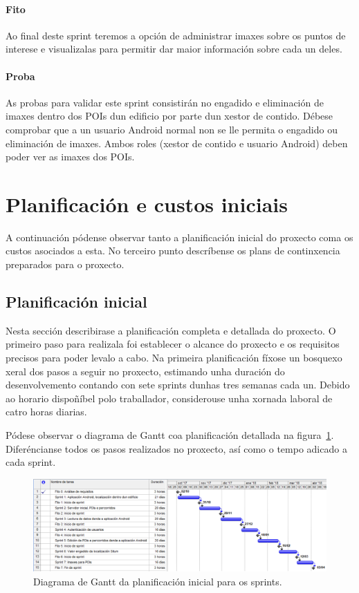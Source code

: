 \paragraph{Fito}
Ao final deste sprint teremos a opción de administrar imaxes sobre os puntos de interese e visualizalas para permitir dar maior información sobre cada un deles.

\paragraph{Proba}
As probas para validar este sprint consistirán no engadido e eliminación de imaxes dentro dos POIs dun edificio por parte dun xestor de contido. Débese comprobar que a un usuario Android normal non se lle permita o engadido ou eliminación de imaxes. Ambos roles (xestor de contido e usuario Android) deben poder ver as imaxes dos POIs.


\section{Planificación e custos iniciais}
A continuación pódense observar tanto a planificación inicial do proxecto coma os custos asociados a esta. No terceiro punto descríbense os plans de continxencia preparados para o proxecto.

\subsection{Planificación inicial}
Nesta sección describirase a planificación completa e detallada do proxecto. O primeiro paso para realizala foi establecer o alcance do proxecto e os requisitos precisos para poder levalo a cabo. Na primeira planificación fíxose un bosquexo xeral dos pasos a seguir no proxecto, estimando unha duración do desenvolvemento contando con sete sprints dunhas tres semanas cada un. Debido ao horario dispoñíbel polo traballador, considerouse unha xornada laboral de catro horas diarias.

Pódese observar o diagrama de Gantt coa planificación detallada na figura~\ref{fig:planificacionInicial}. Diferéncianse todos os pasos realizados no proxecto, así como o tempo adicado a cada sprint.

\begin{figure}[tbh] 
	\begin{center}
		\includegraphics[width=1\textwidth]{figures/Capturas/planificacionInicial}
		\caption{Diagrama de Gantt da planificación inicial para os sprints.}
		\label{fig:planificacionInicial}
	\end{center}
\end{figure}

